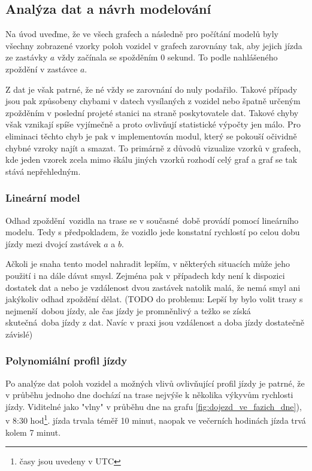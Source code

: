 \subsection{Analýza dat a návrh modelování} \label{subsubsection:analyza_dat}

Na úvod uveďme, že ve všech grafech a následně pro počítání modelů byly všechny zobrazené vzorky poloh vozidel v grafech zarovnány tak, aby jejich jízda ze zastávky $a$ vždy začínala se spožděním 0 sekund. To podle nahlášeného zpoždění v zastávce $a$.

\bigbreak

Z dat je však patrné, že né vždy se zarovnání do nuly podařilo. Takové případy jsou pak způsobeny chybami v datech vysílaných z vozidel nebo špatně určeným zpožděním v poslední projeté stanici na straně poskytovatele dat. Takové chyby však vznikají spíše vyjímečně a proto ovlivňují statistické výpočty jen málo. Pro eliminaci těchto chyb je pak v implementován modul, který se pokouší očividně chybné vzroky najít a smazat. To primárně z důvodů vizualize vzorků v grafech, kde jeden vzorek zcela mimo škálu jiných vzorků rozhodí celý graf a graf se tak stává nepřehledným.

\subsubsection{Lineární model}


Odhad zpoždění vozidla na trase se v současné době provádí pomocí lineárního modelu. Tedy s předpokladem, že vozidlo jede konstatní rychlostí po celou dobu jízdy mezi dvojcí zastávek $a$ a $b$.

\bigbreak

Ačkoli je snaha tento model nahradit lepším, v některých situacích může jeho použití i na dále dávat smysl. Zejména pak v případech kdy není k dispozici dostatek dat a nebo je vzdálenost dvou zastávek natolik malá, že nemá smyl ani jakýkoliv odhad zpoždění dělat. (TODO do problemu: Lepší by bylo volit trasy s nejmenší dobou jízdy, ale čas jízdy je promněnlivý a težko se získá skutečná doba jízdy z dat. Navíc v praxi jsou vzdálenost a doba jízdy dostatečně závislé)

\subsubsection{Polynomiální profil jízdy}

Po analýze dat poloh vozidel a možných vlivů ovlivňující profil jízdy je patrné, že v průběhu jednoho dne dochází na trase nejvýše k několika výkyvům rychlosti jízdy. Viditelné jako "vlny" v průběhu dne na grafu \ref{fig:dojezd_ve_fazich_dne}), v 8:30 hod\footnote{časy jsou uvedeny v UTC}. jízda trvala téměř 10 minut, naopak ve večerních hodinách jízda trvá kolem 7 minut.

